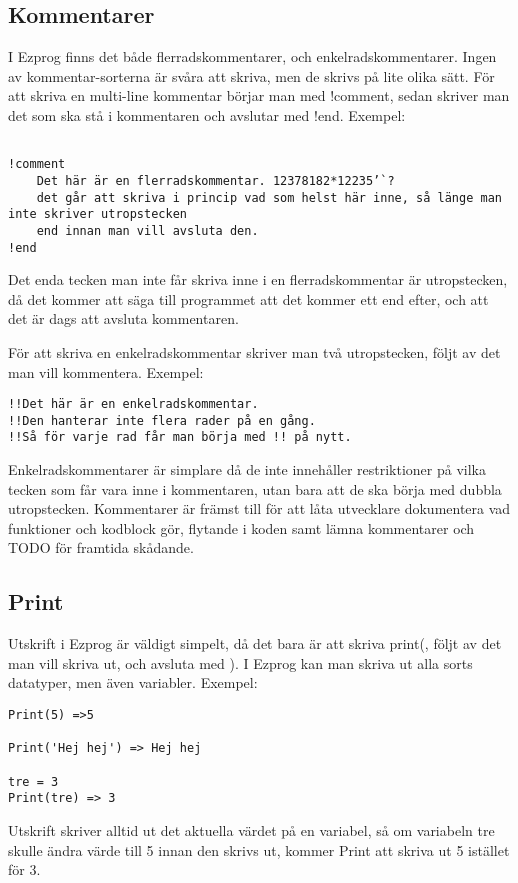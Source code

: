 \documentclass{TDP003mall}
\begin{document}
\subsection{Kommentarer}
I Ezprog finns det både flerradskommentarer, och enkelradskommentarer. Ingen av kommentar-sorterna är svåra att skriva, men de skrivs på lite olika sätt. För att skriva en multi-line kommentar börjar man med !comment, sedan skriver man det som ska stå i kommentaren och avslutar med !end. 
Exempel:
\begin{lstlisting}

!comment
    Det här är en flerradskommentar. 12378182*12235’`?
    det går att skriva i princip vad som helst här inne, så länge man inte skriver utropstecken
    end innan man vill avsluta den.
!end
\end{lstlisting}
Det enda tecken man inte får skriva inne i en flerradskommentar är utropstecken, då det kommer att säga till programmet att det kommer ett end efter, och att det är dags att avsluta kommentaren.

För att skriva en enkelradskommentar skriver man två utropstecken, följt av det man vill kommentera.
Exempel:
\begin{lstlisting}
!!Det här är en enkelradskommentar.
!!Den hanterar inte flera rader på en gång.
!!Så för varje rad får man börja med !! på nytt.
\end{lstlisting}
Enkelradskommentarer är simplare då de inte innehåller restriktioner på vilka tecken som får vara inne i kommentaren, utan bara att de ska börja med dubbla utropstecken. Kommentarer är främst till för att låta utvecklare dokumentera vad funktioner och kodblock gör, flytande i koden samt lämna kommentarer och TODO för framtida skådande.
\clearpage
\subsection{Print}
Utskrift i Ezprog är väldigt simpelt, då det bara är att skriva print(, följt av det man vill skriva ut, och avsluta med ). I Ezprog kan man skriva ut alla sorts datatyper, men även variabler.
Exempel:
\begin{lstlisting}
Print(5) =>5

Print('Hej hej') => Hej hej

tre = 3
Print(tre) => 3
\end{lstlisting}
Utskrift skriver alltid ut det aktuella värdet på en variabel, så om variabeln tre skulle ändra värde till 5 innan den skrivs ut, kommer Print att skriva ut 5 istället för 3.
\end{document}
